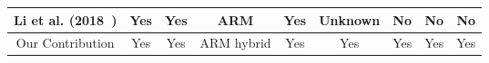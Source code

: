\begin{landscape}
\begin{table}[htbp]
\begin{tabular}{|c|c|c|c|c|c|c|c|c|}
            \hline
            Li et al. (2018~\cite{li2018development})     & Yes                    & Yes               & ARM             & Yes              & Unknown             & No                 & No                & No                      \\
            \hline
            Our Contribution                              & Yes                    & Yes               & ARM hybrid      & Yes              & Yes                 & Yes                & Yes               & Yes                     \\
            \hline
        \end{tabular}
    \end{table}
\end{landscape}
